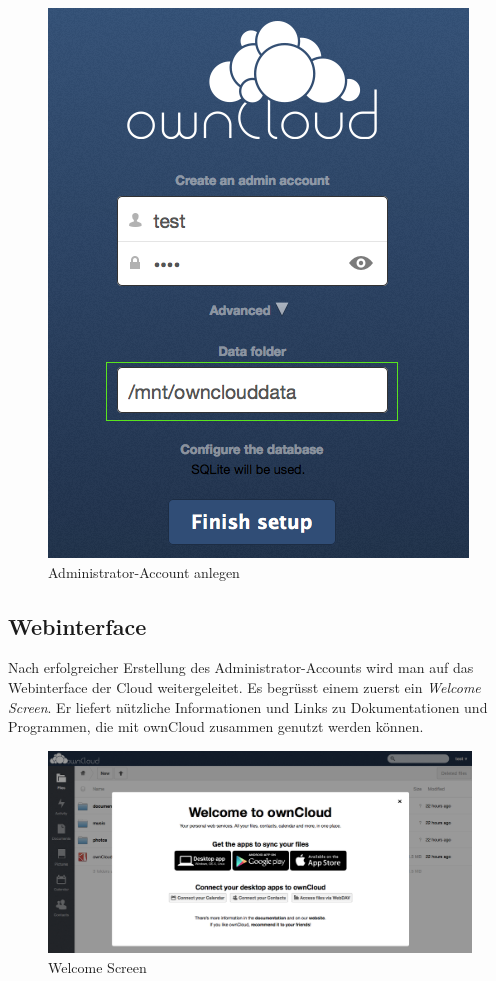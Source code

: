 \begin{figure}[H]
\centering
\includegraphics[scale=0.4]{images/admin_setup}
\caption{Administrator-Account anlegen}
\end{figure}

\subsection{Webinterface}
Nach erfolgreicher Erstellung des Administrator-Accounts wird man auf das Webinterface der Cloud weitergeleitet. Es begrüsst einem zuerst ein \textit{Welcome Screen}. Er liefert nützliche Informationen und Links zu Dokumentationen und Programmen, die mit ownCloud zusammen genutzt werden können.

\begin{figure}[H]
\centering
\includegraphics[scale=0.4]{images/welcomescreen}
\caption{Welcome Screen}
\end{figure}


